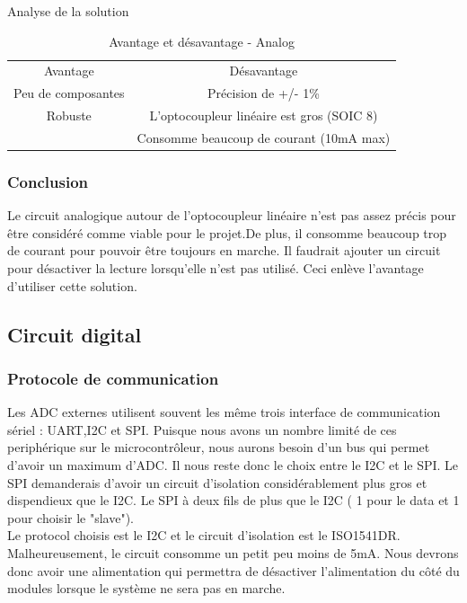 \documentclass[12pt,letterpaper]{article}
\begin{document}
\begin{normalsize}
					\begin{table}[h!]
					\centering
					Analyse de la solution\\ \vspace{0.2cm}
						\begin{tabular}{|c|c|}
							\hline
							Avantage & D\'{e}savantage\\ \hhline{|=|=|}
							Peu de composantes & Pr\'{e}cision de +/- 1\% \\ \hline
							Robuste & L'optocoupleur lin\'{e}aire est gros (SOIC 8)\\ \hline
							 & Consomme beaucoup de courant (10mA max)\\ \hline
						\end{tabular}
						\caption{Avantage et d\'{e}savantage - Analog}
						\label{Table:2}
					\end{table} 
					
				\subsubsection{Conclusion}
				Le circuit analogique autour de l'optocoupleur lin\'{e}aire n'est pas assez pr\'{e}cis pour \^{e}tre consid\'{e}r\'{e} comme viable pour le projet.De plus, il consomme beaucoup trop de courant pour pouvoir \^{e}tre toujours en marche. Il faudrait ajouter un circuit pour d\'{e}sactiver la lecture lorsqu'elle n'est pas utilis\'{e}. Ceci enl\`{e}ve l'avantage d'utiliser cette solution. 
				\newpage
				
			\subsection{Circuit digital}
				\subsubsection{Protocole de communication}
					Les ADC externes utilisent souvent les m\^{e}me trois interface de communication s\'{e}riel : UART,I2C et SPI. Puisque nous avons un nombre limit\'{e} de ces periph\'{e}rique sur le microcontr\^{o}leur, nous aurons besoin d'un bus qui permet d'avoir un maximum d'ADC. Il nous reste donc le choix entre le I2C et le SPI. Le SPI demanderais d'avoir un circuit d'isolation consid\'{e}rablement plus gros et dispendieux que le I2C. Le SPI \`{a} deux fils de plus que le I2C ( 1 pour le data et 1 pour choisir le "slave"). \\
					Le protocol choisis est le I2C et le circuit d'isolation est le ISO1541DR. Malheureusement, le circuit consomme un petit peu moins de 5mA. Nous devrons donc avoir une alimentation qui permettra de d\'{e}sactiver l'alimentation du c\^{o}t\'{e} du modules lorsque le syst\`{e}me ne sera pas en marche.
					

\end{normalsize}
\end{document}
